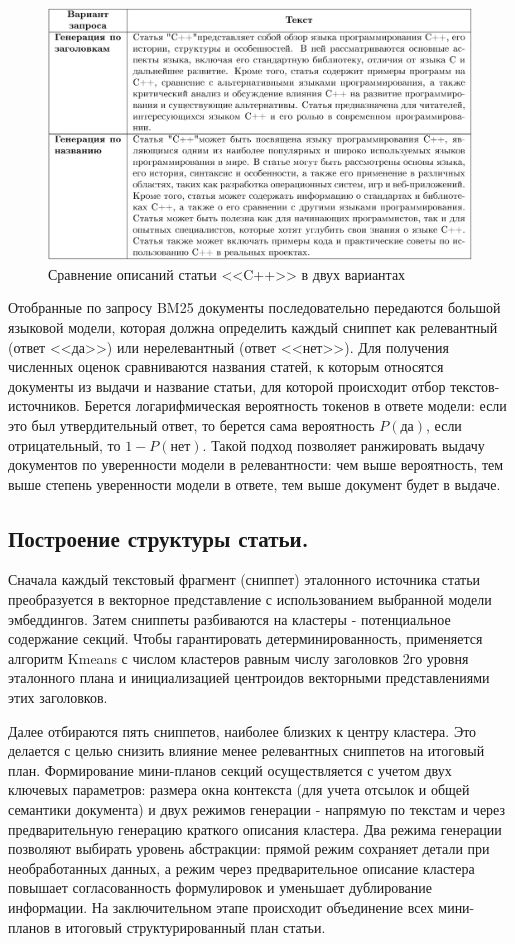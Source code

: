 \documentclass{article}
\begin{document}
\begin{figure}[ht!]
  \centering
  \includegraphics[width=\textwidth]{figures/two_queries.png}
  \caption{Сравнение описаний статьи <<C++>> в двух вариантах}
  \label{fig:cxx}
\end{figure}

Отобранные по запросу BM25 документы последовательно передаются большой языковой модели, которая должна определить каждый сниппет как релевантный (ответ <<да>>) или нерелевантный (ответ <<нет>>). 
Для получения численных оценок сравниваются названия статей, к которым относятся документы из выдачи и название статьи, для которой происходит отбор текстов-источников. 
Берется логарифмическая вероятность токенов в ответе модели: если это был утвердительный ответ, то берется сама вероятность $P(\text{да})$, если отрицательный, то $1 - P(\text{нет})$.
Такой подход позволяет ранжировать выдачу документов по уверенности модели в релевантности: чем выше вероятность, тем выше степень уверенности модели в ответе, тем выше документ будет в выдаче.

\subsection*{Построение структуры статьи.}
Сначала каждый текстовый фрагмент (сниппет) эталонного источника статьи преобразуется в векторное представление с использованием выбранной модели эмбеддингов. 
Затем сниппеты разбиваются на кластеры - потенциальное содержание секций. 
Чтобы гарантировать детерминированность, применяется алгоритм Kmeans с числом кластеров равным числу заголовков 2го уровня эталонного плана и инициализацией центроидов векторными представлениями этих заголовков. 

Далее отбираются пять сниппетов, наиболее близких к центру кластера. Это делается с целью снизить влияние менее релевантных сниппетов на итоговый план. 
Формирование мини-планов секций осуществляется с учетом двух ключевых параметров: 
размера окна контекста (для учета отсылок и общей семантики документа) и двух режимов генерации - напрямую по текстам и через предварительную генерацию краткого описания кластера.
Два режима генерации позволяют выбирать уровень абстракции: 
прямой режим сохраняет детали при необработанных данных, а режим через предварительное описание кластера
повышает согласованность формулировок и уменьшает дублирование информации.
На заключительном этапе происходит объединение всех мини-планов в итоговый структурированный план статьи.
\end{document}
